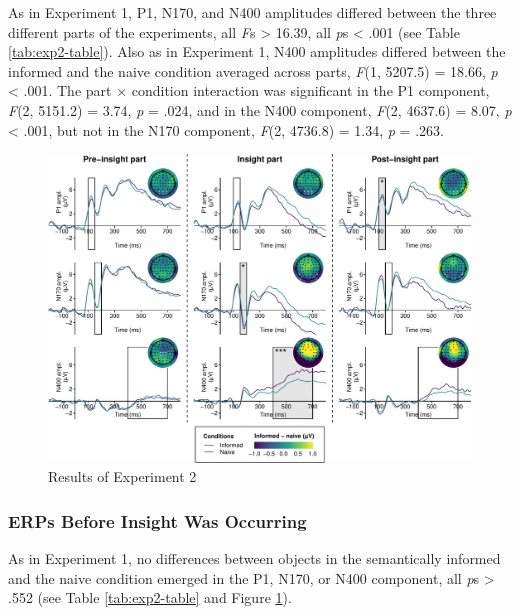 \documentclass[
  english,
  man,floatsintext]{apa7}
\begin{document}
As in Experiment 1, P1, N170, and N400 amplitudes differed between the three different parts of the experiments, all \emph{F}s \textgreater{} 16.39, all \emph{p}s \textless{} .001 (see Table \ref{tab:exp2-table}). Also as in Experiment 1, N400 amplitudes differed between the informed and the naive condition averaged across parts, \emph{F}(1, 5207.5) = 18.66, \emph{p} \textless{} .001. The part × condition interaction was significant in the P1 component, \emph{F}(2, 5151.2) = 3.74, \emph{p} = .024, and in the N400 component, \emph{F}(2, 4637.6) = 8.07, \emph{p} \textless{} .001, but not in the N170 component, \emph{F}(2, 4736.8) = 1.34, \emph{p} = .263.

\begin{figure}

{\centering \includegraphics[width=1\linewidth]{manuscript_files/figure-latex/exp2-plot-1} 

}

\caption{Results of Experiment 2\smallskip}\label{fig:exp2-plot}
\end{figure}



\hypertarget{erps-before-insight-was-occurring-1}{%
\subsubsection{ERPs Before Insight Was Occurring}\label{erps-before-insight-was-occurring-1}}

As in Experiment 1, no differences between objects in the semantically informed and the naive condition emerged in the P1, N170, or N400 component, all \emph{p}s \textgreater{} .552 (see Table \ref{tab:exp2-table} and Figure \ref{fig:exp2-plot}).
\end{document}
